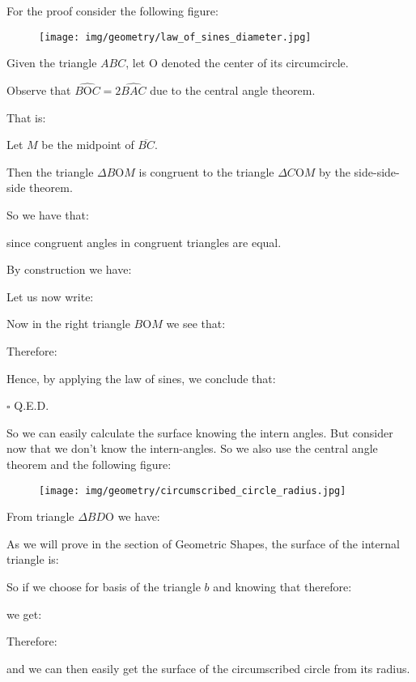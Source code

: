 	\begin{theorem}
	
	\end{theorem}
	\begin{dem}
	For the proof consider the following figure:
	\begin{figure}[H]
		\centering
		\texttt{[image: img/geometry/law\_of\_sines\_diameter.jpg]}
	\end{figure}
	Given the triangle $ABC$, let O denoted the center of its circumcircle. 

	Observe that $\widehat{B\text{O}C}=2\widehat{BAC}$ due to the central angle theorem.

	That is:
	
	Let $M$ be the midpoint of $\overline{BC}$.

	Then the triangle $\Delta B\text{O}M$ is congruent to the triangle $\Delta C\text{O}M$ by the side-side-side theorem.
	
	So we have that:
	
	since congruent angles in congruent triangles are equal.
	
	By construction we have:
	
	Let us now write:
	
	Now in the right triangle $B\text{O}M$ we see that:
	
	Therefore:
	
	Hence, by applying the law of sines, we conclude that:
	
	\begin{flushright}
		$\square$  Q.E.D.
	\end{flushright}
	\end{dem}
	So we can easily calculate the surface knowing the intern angles. But consider now that we don't know the intern-angles. So we also use the central angle theorem and the following figure:
	\begin{figure}[H]
		\centering
		\texttt{[image: img/geometry/circumscribed\_circle\_radius.jpg]}
	\end{figure}
	From triangle $\Delta BD\text{O}$ we have:
	
	As we will prove in the section of Geometric Shapes, the surface of the internal triangle is:
	
	So if we choose for basis of the triangle $b$ and knowing that therefore:
	
	we get:
	
	Therefore:
	
	and we can then easily get the surface of the circumscribed circle from its radius.
	
